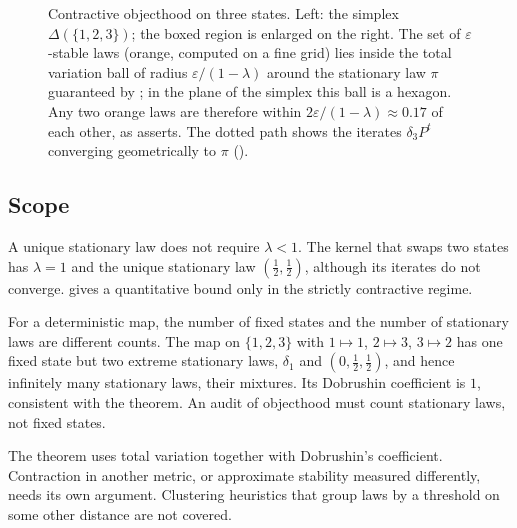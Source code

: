 \begin{figure}[t]
\caption{Contractive objecthood on three states. Left: the simplex $\Delta(\{1,2,3\})$; the boxed region is enlarged on the right. The set of $\varepsilon$-stable laws (orange, computed on a fine grid) lies inside the total variation ball of radius $\varepsilon/(1-\lambda)$ around the stationary law $\pi$ guaranteed by ; in the plane of the simplex this ball is a hexagon. Any two orange laws are therefore within $2\varepsilon/(1-\lambda)\approx 0.17$ of each other, as \thmNGObjectContractive{} asserts. The dotted path shows the iterates $\delta_3P^t$ converging geometrically to $\pi$ ().}\label{fig:simplex}
\end{figure}

\subsection{Scope}

\begin{remark}
A unique stationary law does not require $\lambda<1$.
The kernel that swaps two states has $\lambda=1$ and the unique stationary law $(\tfrac12,\tfrac12)$, although its iterates do not converge.
\thmNGObjectContractive{} gives a quantitative bound only in the strictly contractive regime.
\end{remark}

\begin{remark}
For a deterministic map, the number of fixed states and the number of stationary laws are different counts.
The map on $\{1,2,3\}$ with $1\mapsto 1$, $2\mapsto 3$, $3\mapsto 2$ has one fixed state but two extreme stationary laws, $\delta_1$ and $(0,\tfrac12,\tfrac12)$, and hence infinitely many stationary laws, their mixtures.
Its Dobrushin coefficient is $1$, consistent with the theorem.
An audit of objecthood must count stationary laws, not fixed states.
\end{remark}

\begin{remark}[Metric]
The theorem uses total variation together with Dobrushin's coefficient.
Contraction in another metric, or approximate stability measured differently, needs its own argument.
Clustering heuristics that group laws by a threshold on some other distance are not covered.
\end{remark}
